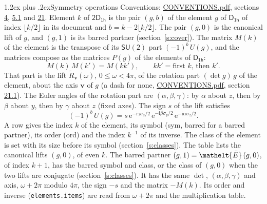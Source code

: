 \documentclass[10pt,a4paper]{article}
\makeatletter
\renewcommand\section{\@startsection{section}{1}{\z@}{-3ex plus -1ex minus -.2ex}%
  {1.2ex plus .2ex}{\normalfont\large\sffamily\bfseries\color{parttitle}}}
\numberwithin{equation}{section}
\newcommand{\eltfont}[1]{{\let\sigma\eltsigma\mathelt{#1}}}
\newcommand{\grp}[1]{\mathsf{#1}}
\newcommand{\elt}[1]{\eltfont{#1}}
\newcommand{\vv}{\mathbf{v}}
\newcommand{\iunit}{\mathrm{i}}
\newcommand{\expe}{\mathrm{e}}
\newcommand{\barred}[1]{\bar{#1}}
\newcommand{\lift}[1]{\tilde{#1}}
\newcommand{\pauli}[1]{\sigma_{#1}}
\makeatother
\begin{document}
\section{Symmetry operations}\label{s:elements}
Conventions: \href{../../CONVENTIONS.pdf}{CONVENTIONS.pdf}, sections \href{../../../rotation/CONVENTIONS.pdf\#conv.4}{4}, \href{../../../rotation/CONVENTIONS.pdf\#conv.5.1}{5.1} and \href{../../CONVENTIONS.pdf\#conv.21}{21}.
\leavevmode\label{n:index.element}\label{n:element.g}Element $k$ of $\grp{2D_{1h}}$ is the pair $(g, b)$ of the element $g$ of \href{../../../rotation/data/pdf/D1h.pdf}{$\grp{D_{1h}}$} of index $\lfloor k/2\rfloor$ in its document and $b = k - 2\lfloor k/2\rfloor$. The pair $(g, 0)$ is the canonical lift of $g$, and $(g, 1)$ is its barred partner (section~\ref{s:cover}). \label{n:matrix.element.pin}\label{n:matrix.element}The matrix $M(k)$ of the element is the transpose of its $\grp{SU(2)}$ part $(-1)^{b}\,U(g)$, and the matrices compose as the matrices $P(g)$ of the elements of $\grp{D_{1h}}$:
\begin{equation}\label{e:mprod}M(k)\,M(k') = M(kk'),\qquad kk' = \text{first } k\text{, then } k'.\end{equation}
\leavevmode\label{n:angle.omega}\label{n:vector.axis}\label{n:vector.pole}That part is the lift $\lift{R}_{\vv}(\omega)$, $0 \le \omega < 4\pi$, of the rotation part $(\det g)\,g$ of the element, about the axis $\vv$ of $g$ (a dash for none, \href{../../CONVENTIONS.pdf}{CONVENTIONS.pdf}, section \href{../../CONVENTIONS.pdf\#conv.21.1}{21.1}). \label{n:angle.euler.alpha}\label{n:angle.euler.beta}\label{n:angle.euler.gamma}\label{n:vector.coordinates}The Euler angles of the rotation part are $(\alpha,\beta,\gamma)$: by $\alpha$ about $z$, then by $\beta$ about $y$, then by $\gamma$ about $z$ (fixed axes). \label{n:local.euler.sign}The sign $s$ of the lift satisfies
\begin{equation}\label{e:euler}(-1)^{b}\,U(g) = s\,\expe^{-\iunit\gamma\pauli{z}/2}\,\expe^{-\iunit\beta\pauli{y}/2}\,\expe^{-\iunit\alpha\pauli{z}/2}.\end{equation}
\leavevmode\label{n:index.element.inverse}\label{n:head.sym}\label{n:head.ord}A row gives the index $k$ of the element, its symbol (sym, barred for a barred partner), its order (ord) and the index $k^{-1}$ of its inverse. \label{n:head.class}The class of the element is set with its size before its symbol (section~\ref{s:classes}).
The table lists the canonical lifts $(g, 0)$, of even $k$. The barred partner $(g, 1) = \elt{\barred{E}}\,(g, 0)$, of index $k + 1$, has the barred symbol and class, or the class of $(g, 0)$ when the two lifts are conjugate (section~\ref{s:classes}). It has the same $\det$, $(\alpha,\beta,\gamma)$ and axis, $\omega + 2\pi$ modulo $4\pi$, the sign $-s$ and the matrix $-M(k)$. Its order and inverse (\texttt{elements.items}) are read from $\omega + 2\pi$ and the multiplication table.
\end{document}
